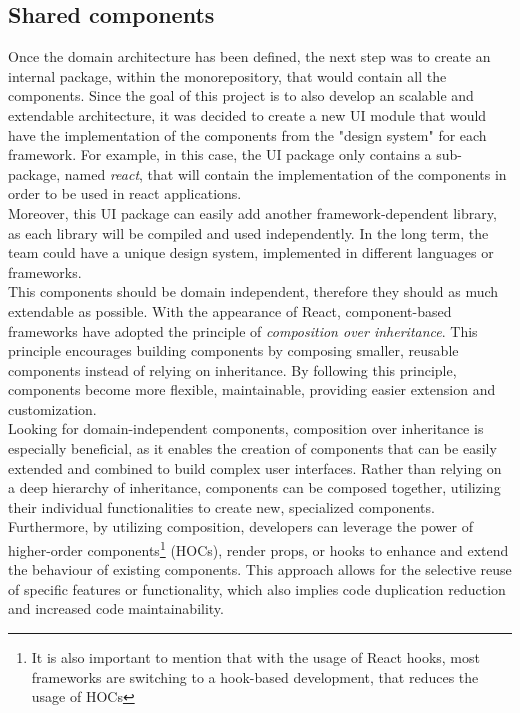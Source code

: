 \documentclass[../design.tex]{subfiles}
\begin{document}
\subsection{Shared components}
Once the domain architecture has been defined, the next step was to create an
internal package, within the monorepository, that would contain all the
components. Since the goal of this project is to also develop an scalable and
extendable architecture, it was decided to create a new UI module that would
have the implementation of the components from the "design system" for each
framework. For example, in this case, the UI package only contains a
sub-package, named \emph{react}, that will contain the implementation of the
components in order to be used in react applications.
\\
Moreover, this UI package can easily add another framework-dependent library, as
each library will be compiled and used independently. In the long term, the team
could have a unique design system, implemented in different languages or
frameworks.
\\[8pt]
This components should be domain independent, therefore they should as much
extendable as possible. With the appearance of React, component-based frameworks
have adopted the principle of \emph{composition over inheritance}. This
principle encourages building components by composing smaller, reusable
components instead of relying on inheritance. By following this principle,
components become more flexible, maintainable, providing easier extension and
customization.
\\
Looking for domain-independent components, composition over inheritance is
especially beneficial, as it enables the creation of components that can be
easily extended and combined to build complex user interfaces. Rather than
relying on a deep hierarchy of inheritance, components can be composed together,
utilizing their individual functionalities to create new, specialized
components.
\\
Furthermore, by utilizing composition, developers can leverage the power of
higher-order components\footnote{It is also important to mention that with the
	usage of React hooks, most frameworks are switching to a hook-based development,
	that reduces the usage of HOCs} (HOCs), render props, or hooks to enhance and
extend the behaviour of existing components. This approach allows for the
selective reuse of specific features or functionality, which also implies code
duplication reduction and increased code maintainability.
\\
\end{document}
